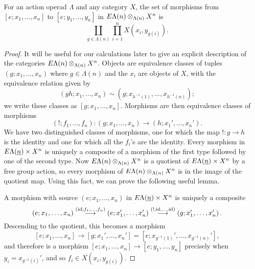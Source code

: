 





\begin{prop}\label{prop:hom-set-lemma}
For an action operad $\Lambda$ and any category $X$, the set of morphisms from $[e; x_1, \ldots, x_n]$ to $[e; y_1, \ldots, y_n]$ in $E\Lambda(n) \otimes_{\Lambda(n)} X^{n}$ is
  \[
    \coprod_{g \in \Lambda(n)} \prod_{i=1}^{n} X\left(x_i, y_{g(i)}\right).
  \]
\end{prop}
\begin{proof}
It will be useful for our calculations later to give an explicit description of the categories $E\Lambda(n) \otimes_{\Lambda(n)} X^{n}$. Objects are equivalence classes of tuples $(g; x_1, \ldots, x_n)$ where $g \in \Lambda(n)$ and the $x_{i}$ are objects of $X$, with the equivalence relation given by
  \[
    (gh; x_1, \ldots, x_n) \sim \left(g; x_{h^{-1}(1)}, \ldots, x_{h^{-1}(n)}\right);
  \]
  we write these classes as $[g; x_1, \ldots, x_n]$. Morphisms are then equivalence classes of morphisms
  \[
    (!; f_1, \ldots, f_n) \colon  (g; x_1, \ldots, x_n) \rightarrow \left(h; x_1', \ldots, x_n'\right).
  \]
We have two distinguished classes of morphisms, one for which the map $! \colon  g \rightarrow h$ is the identity and one for which all the $f_{i}$'s are the identity. Every morphism in $E\Lambda(\underline{n}) \times X^{n}$ is uniquely a composite of a  morphism of the first type followed by one of the second type. Now $E\Lambda(n) \otimes_{\Lambda(n)} X^{n}$ is a quotient of $E\Lambda(\underline{n}) \times X^{n}$ by a free group action, so every morphism of $E\Lambda(n) \otimes_{\Lambda(n)} X^{n}$ is in the image of the quotient map. Using this fact, we can prove the following useful lemma.

A morphism with source $(e; x_1, \ldots, x_n)$ in $E\Lambda(\underline{n}) \times X^{n}$ is uniquely a composite
  \[
    (e; x_1, \ldots, x_n) \stackrel{(\textrm{id}; f_{1}, \ldots, f_{n})}{\longrightarrow} \left(e; x_1', \ldots, x_n'\right) \stackrel{(!; \textrm{id}, \ldots, \textrm{id})}{\longrightarrow} \left(g; x_1', \ldots, x_n'\right).
  \]
Descending to the quotient, this becomes a morphism
  \[
    [e; x_1, \ldots, x_n] \rightarrow \left[g; x_1', \ldots, x_n'\right] = \left[e; x_{g^{-1}(1)}', \ldots, x_{g^{-1}(n)}'\right],
  \]
and therefore is a morphism $[e; x_1, \ldots, x_n] \rightarrow [e; y_1, \ldots, y_n]$ precisely when $y_i = x_{g^{-1}(i)}'$, and so $f_i \in   X(x_i, y_{g(i)})$.
\end{proof}

